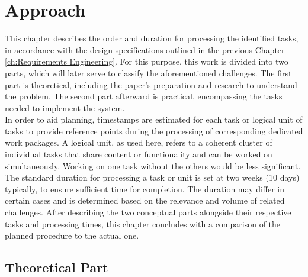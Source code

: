 

\chapter{Approach}
\label{ch:Approach}

This chapter describes the order and duration for processing the identified tasks, in accordance with the design specifications outlined in the previous Chapter \ref{ch:Requirements Engineering}. 
For this purpose, this work is divided into two parts, which will later serve to classify the aforementioned challenges.
The first part is theoretical, including the paper's preparation and research to understand the problem. 
The second part afterward is practical, encompassing the tasks needed to implement the system. \\
\noindent In order to aid planning, timestamps are estimated for each task or logical unit of tasks to provide reference points during the processing of corresponding dedicated work packages. 
A logical unit, as used here, refers to a coherent cluster of individual tasks that share content or functionality and can be worked on simultaneously. Working on one task without the others would be less significant.
The standard duration for processing a task or unit is set at two weeks (10 days) typically, to ensure sufficient time for completion. The duration may differ in certain cases and is determined based on the relevance and volume of related challenges. 
After describing the two conceptual parts alongside their respective tasks and processing times, this chapter concludes with a comparison of the planned procedure to the actual one.

\section{Theoretical Part}
\label{ch:Approach:sec:Theoretical Part}

